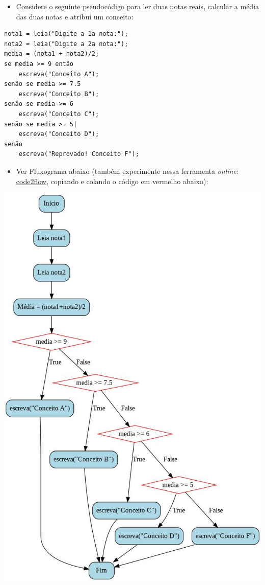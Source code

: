 \documentclass[12pt,a4paper]{article}
\providecommand{\tightlist}{%
      \setlength{\itemsep}{0pt}\setlength{\parskip}{0pt}}
\begin{document}
    \begin{itemize}
\tightlist
\item
  Considere o seguinte pseudocódigo para ler duas notas reais, calcular
  a média das duas notas e atribui um conceito:
\end{itemize}

    \begin{verbatim}
nota1 = leia("Digite a 1a nota:");
nota2 = leia("Digite a 2a nota:");
media = (nota1 + nota2)/2;
se media >= 9 então  
    escreva("Conceito A"); 
senão se media >= 7.5  
    escreva("Conceito B"); 
senão se media >= 6 
    escreva("Conceito C"); 
senão se media >= 5| 
    escreva("Conceito D"); 
senão 
    escreva("Reprovado! Conceito F"); 
\end{verbatim}

    \begin{itemize}
\tightlist
\item
  Ver Fluxograma abaixo (também experimente nessa ferramenta
  \emph{online}: \href{https://app.code2flow.com/}{code2flow}, copiando
  e colando o código em vermelho abaixo):
\end{itemize}

\includegraphics{"figs/flowchartCap3b.jpg"}
\end{document}
